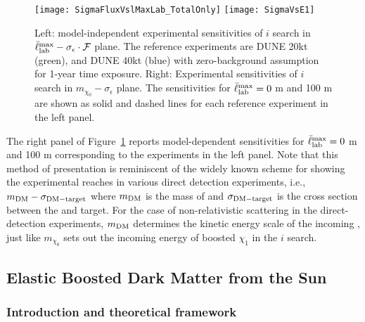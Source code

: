 \begin{figure}[t]
\centering
\texttt{[image: SigmaFluxVslMaxLab\_TotalOnly]}
\texttt{[image: SigmaVsE1]}
\caption[Model-independent experimental sensitivities of $i$ search]{
Left: model-independent experimental sensitivities of $i$ search in $\bar{\ell}_{\rm lab}^{\rm max} - \sigma_\epsilon \cdot \mathcal F$ plane. 
The reference experiments are
DUNE 20kt (green), and DUNE 40kt (blue) with zero-background assumption for 1-year time exposure. 
Right: Experimental sensitivities of $i$ search in $m_{\chi_0} - \sigma_\epsilon$ plane. The sensitivities for $\bar{\ell}_{\rm lab}^{\rm max} = 0$ m and 100 m are shown as solid and dashed lines for each reference experiment in the left panel.
\label{fig:modelindependent} }
\end{figure}

The right panel of Figure~\ref{fig:modelindependent} reports model-dependent sensitivities for $\bar{\ell}_{\rm lab}^{\rm max} = 0$ m and 100 m corresponding to the experiments in the left panel.
Note that this %
method of presentation is reminiscent of the widely known scheme for showing the experimental reaches in various  direct detection experiments, i.e., $m_{\rm DM} - \sigma_{\rm DM - target}$ where $m_{\rm DM}$ is the mass of  and $\sigma_{\rm DM - target}$ is the cross section between the  and target. 
For the case of non-relativistic  scattering in the direct-detection experiments, $m_{\rm DM}$ determines the kinetic energy scale of the incoming , just like $m_{\chi_0}$ sets out the incoming energy of boosted $\chi_1$ in the $i$ search. 

\subsection{Elastic Boosted Dark Matter from the Sun \label{sec:FDsun}}

\subsubsection{\label{sec:level2} Introduction and theoretical framework}

